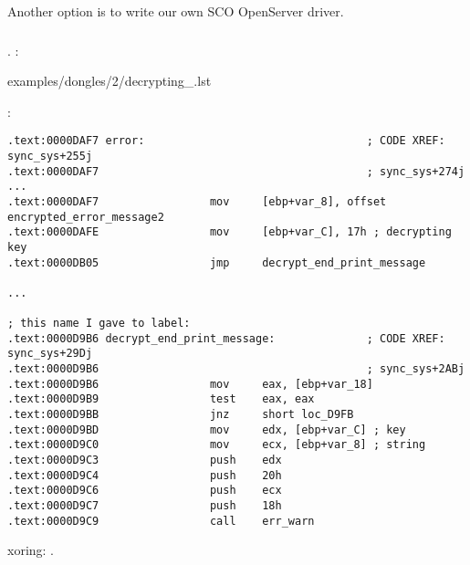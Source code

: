 {Another option is to write our own SCO OpenServer driver}.

\subsubsection{}

.
  
:


{examples/dongles/2/decrypting_\LANG.lst}

:

\begin{lstlisting}
.text:0000DAF7 error:                                  ; CODE XREF: sync_sys+255j
.text:0000DAF7                                         ; sync_sys+274j ...
.text:0000DAF7                 mov     [ebp+var_8], offset encrypted_error_message2
.text:0000DAFE                 mov     [ebp+var_C], 17h ; decrypting key
.text:0000DB05                 jmp     decrypt_end_print_message

...

; this name I gave to label:
.text:0000D9B6 decrypt_end_print_message:              ; CODE XREF: sync_sys+29Dj
.text:0000D9B6                                         ; sync_sys+2ABj
.text:0000D9B6                 mov     eax, [ebp+var_18]
.text:0000D9B9                 test    eax, eax
.text:0000D9BB                 jnz     short loc_D9FB
.text:0000D9BD                 mov     edx, [ebp+var_C] ; key
.text:0000D9C0                 mov     ecx, [ebp+var_8] ; string
.text:0000D9C3                 push    edx
.text:0000D9C4                 push    20h
.text:0000D9C6                 push    ecx
.text:0000D9C7                 push    18h
.text:0000D9C9                 call    err_warn
\end{lstlisting}

 \gls{xoring}: 
.

